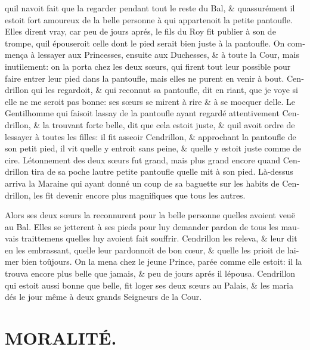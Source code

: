 \documentclass[14pt,a4paper]{memoir}
\newcommand{\notesection}[1]{%
  \addtonotes{\protect\par\protect\vspace{2ex}\protect\noindent\textbf{#1}\protect\par\protect\vspace{1ex}}%
}
\begin{document}
{{\begin{otherlanguage}{french}
qu\textquotesingle il n\textquotesingle avoit fait que la regarder
pendant tout le reste du Bal, \& qu\textquotesingle assurément il estoit
fort amoureux de la belle personne à qui appartenoit la petite
pantoufle. Elles dirent vray, car peu de jours aprés, le fils du Roy fit
publier à son de trompe, qu\textquotesingle il épouseroit celle dont le
pied serait bien juste à la pantoufle. On commença à
l\textquotesingle essayer aux Princesses, ensuite aux Duchesses, \& à
toute la Cour, mais inutilement: on la porta chez les deux sœurs, qui
firent tout leur possible pour faire entrer leur pied dans la pantoufle,
mais elles ne purent en venir à bout. Cendrillon qui les regardoit, \&
qui reconnut sa pantoufle, dit en riant, que je voye si elle ne me
seroit pas bonne: ses sœurs se mirent à rire \& à se mocquer
d\textquotesingle elle. Le Gentilhomme qui faisoit
l\textquotesingle assay de la pantoufle ayant regardé attentivement
Cendrillon, \& la trouvant forte belle, dit que cela estoit juste, \&
qu\textquotesingle il avoit ordre de l\textquotesingle essayer à toutes
les filles: il fit asseoir Cendrillon, \& approchant la pantoufle de son
petit pied, il vit qu\textquotesingle elle y entroit sans peine, \&
qu\textquotesingle elle y estoit juste comme de cire.
L\textquotesingle étonnement des deux sœurs fut grand, mais plus grand
encore quand Cendrillon tira de sa poche l\textquotesingle autre petite
pantoufle qu\textquotesingle elle mit à son pied. Là-dessus arriva la
Maraine qui ayant donné un coup de sa baguette sur les habits de
Cendrillon, les fit devenir encore plus magnifiques que tous les autres.

Alors ses deux sœurs la reconnurent pour la belle personne
qu\textquotesingle elles avoient veuë au Bal. Elles se jetterent à ses
pieds pour luy demander pardon de tous les mauvais traittemens
qu\textquotesingle elles luy avoient fait souffrir. Cendrillon les
releva, \& leur dit en les embrassant, qu\textquotesingle elle leur
pardonnoit de bon cœur, \& qu\textquotesingle elle les prioit de
l\textquotesingle aimer bien toûjours. On la mena chez le jeune Prince,
parée comme elle estoit: il la trouva encore plus belle que jamais, \&
peu de jours aprés il l\textquotesingle épousa. Cendrillon qui estoit
aussi bonne que belle, fit loger ses deux sœurs au Palais, \& les maria
dés le jour même à deux grands Seigneurs de la Cour.

\section{MORALITÉ.}
\notesection{MORALITÉ.}


\end{otherlanguage}}}
\end{document}
